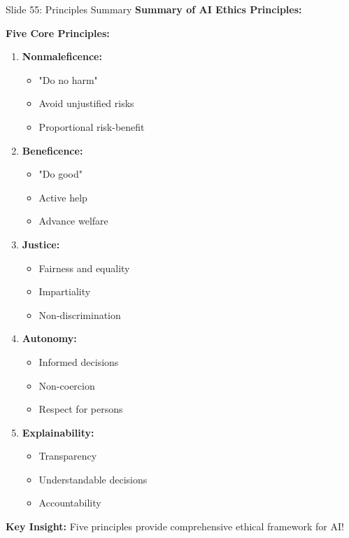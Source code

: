 \documentclass[8pt]{beamer}
\begin{document}
	\begin{frame}{Slide 55: Principles Summary}
		\fontsize{6.5}{7.5}\selectfont
		\textbf{Summary of AI Ethics Principles:}
		
		\vspace{0.1cm}
		\textbf{Five Core Principles:}
		\begin{enumerate}
			\item \textbf{Nonmaleficence:}
			\begin{itemize}
				\item "Do no harm"
				\item Avoid unjustified risks
				\item Proportional risk-benefit
			\end{itemize}
			\item \textbf{Beneficence:}
			\begin{itemize}
				\item "Do good"
				\item Active help
				\item Advance welfare
			\end{itemize}
			\item \textbf{Justice:}
			\begin{itemize}
				\item Fairness and equality
				\item Impartiality
				\item Non-discrimination
			\end{itemize}
			\item \textbf{Autonomy:}
			\begin{itemize}
				\item Informed decisions
				\item Non-coercion
				\item Respect for persons
			\end{itemize}
			\item \textbf{Explainability:}
			\begin{itemize}
				\item Transparency
				\item Understandable decisions
				\item Accountability
			\end{itemize}
		\end{enumerate}
		
		\textcolor{myblue}{\textbf{Key Insight:}} Five principles provide \textcolor{myblue}{comprehensive ethical framework} for AI!
	\end{frame}
	
\end{document}
